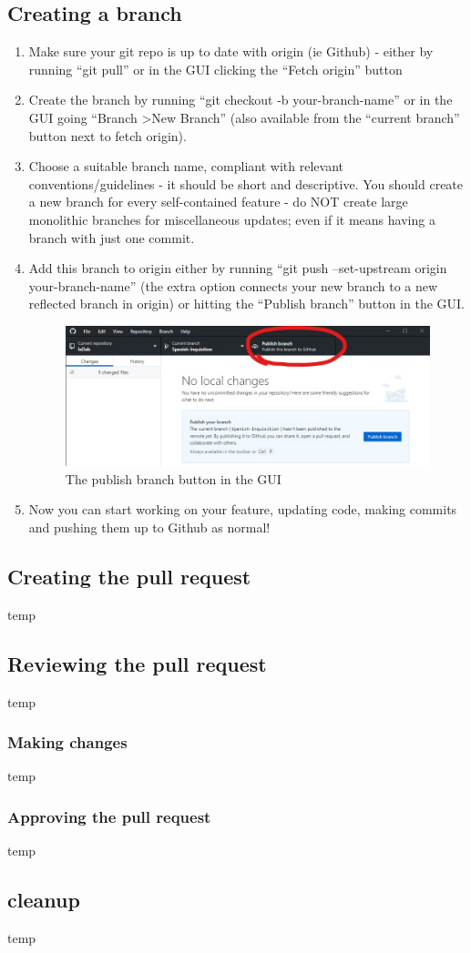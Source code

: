 \documentclass[a4paper, titlepage]{article}
\begin{document}
\subsection{Creating a branch}
\begin{enumerate}
	\item Make sure your git repo is up to date with origin (ie Github) - either by running ``git pull'' or in the GUI clicking the ``Fetch origin'' button
	\item Create the branch by running ``git checkout -b your-branch-name'' or in the GUI going ``Branch \textgreater New Branch'' (also available from the ``current branch'' button next to fetch origin).
	\item Choose a suitable branch name, compliant with relevant conventions/guidelines - it should be short and descriptive. You should create a new branch for every self-contained feature - do NOT create large monolithic branches for miscellaneous updates; even if it means having a branch with just one commit.
	\item Add this branch to origin either by running ``git push --set-upstream origin your-branch-name'' (the extra option connects your new branch to a new reflected branch in origin) or hitting the ``Publish branch'' button in the GUI.
	\begin{figure}[h]
		\centering
		\includegraphics[width=\textwidth]{1publish-branch}
		\caption{The publish branch button in the GUI}
	\end{figure}
	\item Now you can start working on your feature, updating code, making commits and pushing them up to Github as normal!
\end{enumerate}

\subsection{Creating the pull request}
temp

\subsection{Reviewing the pull request}
temp

\subsubsection{Making changes}
temp

\subsubsection{Approving the pull request}
temp

\subsection{cleanup}
temp
\end{document}

